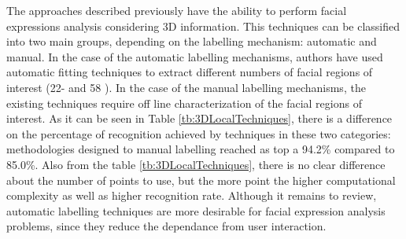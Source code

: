 The approaches described previously have the ability to perform facial expressions analysis considering 3D information. This techniques can be classified into two main groups, depending on the labelling mechanism: automatic and manual. In the case of the automatic labelling mechanisms, authors have used automatic fitting techniques to extract different numbers of facial regions of interest (22- \cite{Rosato2008} and 58 \cite{Wang2007}). In the case of the manual labelling mechanisms, the existing techniques require off line characterization of the facial regions of interest. As it can be seen in Table \ref{tb:3DLocalTechniques}, there is a difference on the percentage of recognition achieved by techniques in these two categories: methodologies designed to manual labelling reached as top a 94.2\% compared to 85.0\%. Also from the table \ref{tb:3DLocalTechniques}, there is no clear difference about the number of points to use, but the more point the higher computational complexity as well as higher recognition rate. Although it remains to review, automatic labelling techniques are more desirable for facial expression analysis problems, since they reduce the dependance from user interaction.


